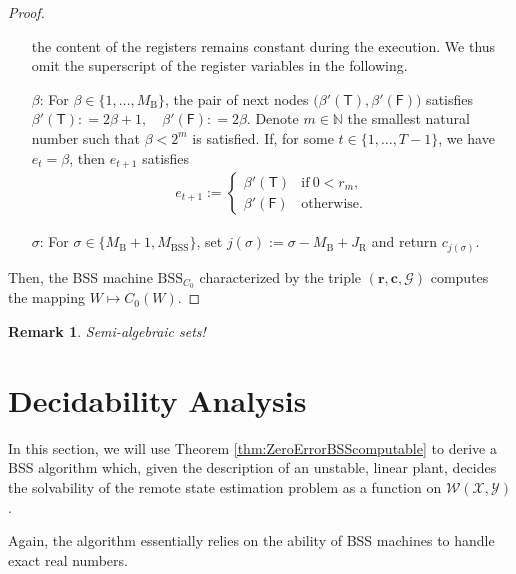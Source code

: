 \documentclass[conference]{IEEEtran}
\def\X{{\mathcal X}}
\def\Y{{\mathcal Y}}
\def\G{{\mathcal G}}
\def\W{{\mathcal W}}
\def\NN{{\mathbb N}}
\newcommand{\BSS}{\mathrm{BSS}}
\newtheorem{Remark}[Theorem]{Remark}
\begin{document}
\begin{proof}
\begin{enumerate}
											the content of the registers remains constant during the execution. We thus omit the superscript of the
											register variables in the following.
										\item[\(\beta\)\hspace{1pt}:] 
											For \(\beta \in \{1,\ldots, M_\mathrm{B}\}\), the pair of next nodes \(\big(\beta'(\mathsf{T}),\beta'(\mathsf{F})\big)\) satisfies
											\(	\beta'(\mathsf{T}) :    =  2\beta + 1, \quad
												\beta'(\mathsf{F}) :    =  2\beta.
											\)
											Denote \(m\in\NN\) the smallest natural number such that \(\beta < 2^m\) is satisfied. If, for some \(t\in\{1,\ldots, T-1\}\), we have
											\(e_t = \beta\), then \(e_{t+1}\) satisfies
											\begin{align*}   e_{t+1} := \begin{cases}	\beta'(\mathsf{T}) &\text{if}~ 0 < r_m,\\
																						\beta'(\mathsf{F}) &\text{otherwise}.
																		\end{cases}
											\end{align*}
										\item[\(\sigma\)\hspace{1pt}:] For \(\sigma \in \{M_\mathrm{B} +1, M_\BSS\}\), set \(j(\sigma) := \sigma - M_\mathrm{B} + J_\mathrm{R}\) 
											and return \(c_{j(\sigma)}\).
					\end{enumerate}
					Then, the BSS machine \(\BSS_{C_0}\) characterized by the triple \((\bm{r}, \bm{c}, \G)\) computes the mapping \(W\mapsto C_0(W)\).
	\end{proof}
	
	\begin{Remark}
		Semi-algebraic sets!
	\end{Remark}

\section{Decidability Analysis}	\label{sec:DecidingRemoteStateEstimationOnBSS}
	In this section, we will use Theorem \ref{thm:ZeroErrorBSScomputable} to derive a BSS algorithm which, given the description of an unstable, linear plant,
	decides the solvability of the remote state estimation problem as a function on \(\W(\X,\Y)\).
	
	Again, the algorithm essentially relies on the ability of BSS machines to handle exact real numbers. 
\end{document}
